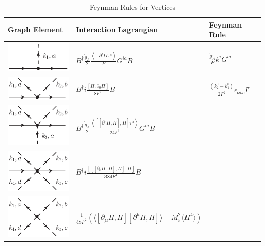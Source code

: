 \documentclass{article}
\begin{document}
\begin{table}
	[ht] \caption{Feynman Rules for Vertices} 
	\vspace{5mm}
	\begin{tabular}{ M{4cm} M{4.5cm} M{4.5cm}}
		\hline 
		Graph Element & Interaction Lagrangian & Feynman Rule\\
		\hline 
		\includegraphics[trim={7cm 24cm 7cm 2cm}, clip=true,width=  4cm]{images/Pi_N_FR_one.eps} &		
		 $B^{\dag}  \frac{\mathring{g}_A}{2} \frac{ \left< -\partial^i\Pi\tau^a \right> }{F}  G^{ia}  B $&
		 $ \frac{\mathring{g}_{A}}{F}  k^{i}G^{ia} $  \\ 
		\includegraphics[trim={7cm 24cm 7cm 2cm}, clip=true,width= 	4cm]{images/Pi_N_FR_two.eps} &
		 $B^{\dag} i\frac{ \left[\Pi,\partial_0 \Pi \right] }{8F^2} B $ &
		 $\frac{\left( k^0_2 - k^0_1 \right)}{2F^2}  \epsilon_{abc}  I^{c}$ \\ 
		\includegraphics[trim={7cm 24cm 7cm 2cm}, clip=true,width= 4cm]{images/Pi_N_FR_three.eps} &
		 $B^{\dag} \frac{\mathring{g}_A}{2} \frac{ \left<  \left[\left[\partial^i\Pi,\Pi \right],\Pi \right] \tau^a \right>  }{24F^3}  G^{ia} B $&
		        \\
		\includegraphics[trim={7cm 24cm 7cm 2cm}, clip=true,width= 4cm]{images/Pi_N_FR_four.eps} &
		 $B^{\dag} i\frac{ \left[\left[\left[\partial_0\Pi,\Pi \right],\Pi \right],\Pi \right] }{384F^4} B $&
		        \\
		\includegraphics[trim={7cm 24cm 7cm 2cm}, clip=true,width= 4cm]{images/Pi_N_FR_pion.eps} &
		 $ \frac{1}{48F^{2}} \left( \Big \langle \left[ \partial_{\mu}\Pi, \Pi \right] \left[ \partial^{\mu}\Pi, \Pi \right] \Big \rangle 
		 +M_{\pi}^2  \langle \Pi^{4}  \rangle \right)$&
		        \\
		\hline
	\end{tabular}
\end{table}
\end{document}
